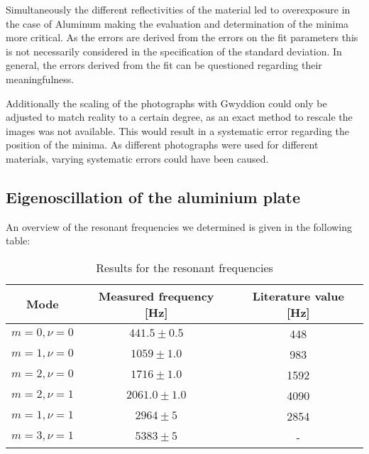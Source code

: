 Simultaneously the different reflectivities of the material led to overexposure in the case of Aluminum making the evaluation and determination of the minima more critical. As the errors are derived from the errors on the fit parameters this is not necessarily considered in the specification of the standard deviation. In general, the errors derived from the fit can be questioned regarding their meaningfulness.

Additionally the scaling of the photographs with Gwyddion could only be adjusted to match reality to a certain degree, as an exact method to rescale the images was not available. This would result in a systematic error regarding the position of the minima. As different photographs were used for different materials, varying systematic errors could have been caused.

\subsection{Eigenoscillation of the aluminium plate}

An overview of the resonant frequencies we determined is given in the following table:

\begin{table}
	\centering
	\begin{tabular}{c|c|c}
	Mode 		& Measured frequency [Hz] 	& Literature value [Hz]\\ \hline\hline
	$m=0,\nu=0$	& $441.5\pm0.5$					& 448	\\ \hline
	$m=1,\nu=0$	& $1059\pm1.0$				& 983	\\ \hline
	$m=2,\nu=0$	& $1716\pm1.0$				& 1592	\\ \hline
	$m=2,\nu=1$	& $2061.0\pm1.0$				& 4090	\\ \hline
	$m=1,\nu=1$	& $2964\pm5$				& 2854 \\ \hline
	$m=3,\nu=1$	& $5383\pm5$				&-
	\end{tabular}
	\caption{Results for the resonant frequencies}
\end{table}

